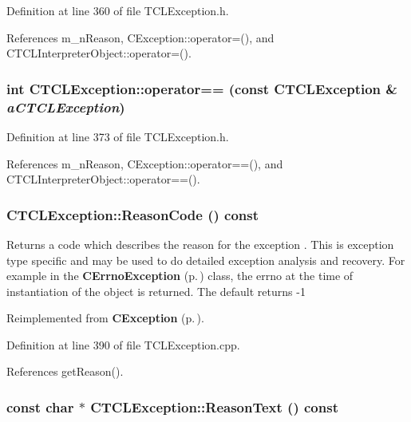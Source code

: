 Definition at line 360 of file TCLException.h.

References m\_\-n\-Reason, CException::operator=(), and CTCLInterpreter\-Object::operator=().
\subsubsection{\setlength{\rightskip}{0pt plus 5cm}int CTCLException::operator== (const CTCLException \& {\em a\-CTCLException})\hspace{0.3cm}{\tt  [inline]}}\label{classCTCLException_a5}




Definition at line 373 of file TCLException.h.

References m\_\-n\-Reason, CException::operator==(), and CTCLInterpreter\-Object::operator==().
\subsubsection{ CTCLException::Reason\-Code () const\hspace{0.3cm}{\tt  [virtual]}}\label{classCTCLException_a14}


Returns a code which describes the reason for the exception . This is exception type specific and may be used to do detailed exception analysis and recovery. For example in the {\bf CErrno\-Exception} {\rm (p.\,\pageref{classCErrnoException})} class, the errno at the time of instantiation of the object is returned. The default returns -1 

Reimplemented from {\bf CException} {\rm (p.\,\pageref{classCException_a9})}.

Definition at line 390 of file TCLException.cpp.

References get\-Reason().
\subsubsection{\setlength{\rightskip}{0pt plus 5cm}const char $\ast$ CTCLException::Reason\-Text () const\hspace{0.3cm}{\tt  [virtual]}}\label{classCTCLException_a13}



